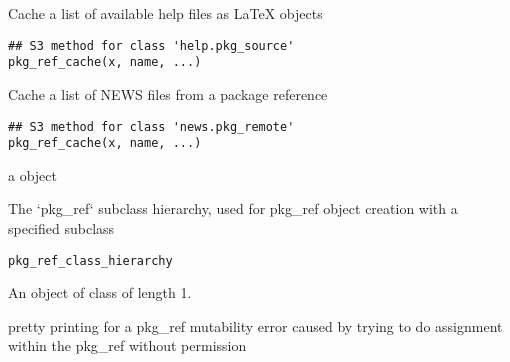 \documentclass[a4paper]{book}
\begin{document}
%
\begin{Description}
Cache a list of available help files as LaTeX objects
\end{Description}
%
\begin{Usage}
\begin{verbatim}
## S3 method for class 'help.pkg_source'
pkg_ref_cache(x, name, ...)
\end{verbatim}
\end{Usage}
%
\begin{Description}
Cache a list of NEWS files from a package reference
\end{Description}
%
\begin{Usage}
\begin{verbatim}
## S3 method for class 'news.pkg_remote'
pkg_ref_cache(x, name, ...)
\end{verbatim}
\end{Usage}
%
\begin{Value}
a  object
\end{Value}
%
\begin{Description}
The `pkg\_ref` subclass hierarchy, used for pkg\_ref object creation with a
specified subclass
\end{Description}
%
\begin{Usage}
\begin{verbatim}
pkg_ref_class_hierarchy
\end{verbatim}
\end{Usage}
%
\begin{Format}
An object of class  of length 1.
\end{Format}
%
\begin{Description}
pretty printing for a pkg\_ref mutability error caused by trying to do
assignment within the pkg\_ref without permission
\end{Description}
\end{document}
